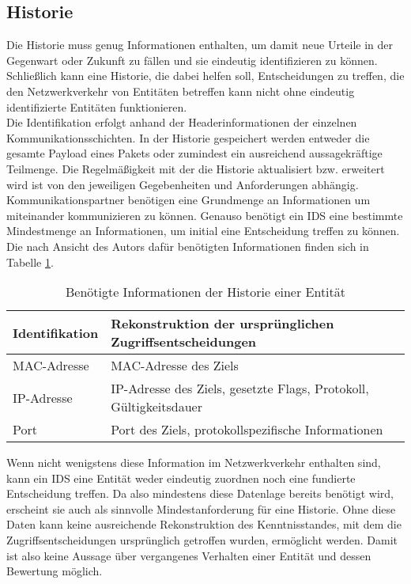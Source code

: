 \subsection{Historie}
\label{subs:Form_Hist}
Die Historie muss genug Informationen enthalten, um damit neue Urteile in der Gegenwart oder Zukunft zu fällen und sie eindeutig identifizieren zu können. Schließlich kann eine Historie, die dabei helfen soll, Entscheidungen zu treffen, die den Netzwerkverkehr von Entitäten betreffen kann nicht ohne eindeutig identifizierte Entitäten funktionieren.\\ Die Identifikation erfolgt anhand der Headerinformationen der einzelnen Kommunikationsschichten. In der Historie gespeichert werden entweder die gesamte Payload eines Pakets oder zumindest ein ausreichend aussagekräftige Teilmenge. Die Regelmäßigkeit mit der die Historie aktualisiert bzw. erweitert wird ist von den jeweiligen Gegebenheiten und Anforderungen abhängig. Kommunikationspartner benötigen eine Grundmenge an Informationen um miteinander kommunizieren zu können. Genauso benötigt ein IDS  eine bestimmte Mindestmenge an Informationen, um initial eine Entscheidung treffen zu können. Die nach Ansicht des Autors dafür benötigten Informationen finden sich in Tabelle \ref{Tabelle_3}.
\begin{table}[H]
\label{Tabelle_3}
\caption{Benötigte Informationen der Historie einer Entität}
\begin{tabularx}{\columnwidth}{p{3cm} p{12cm}}
\toprule
Identifikation & Rekonstruktion der ursprünglichen  Zugriffsentscheidungen\\
\midrule
MAC-Adresse & MAC-Adresse des Ziels \\
IP-Adresse & IP-Adresse des Ziels, gesetzte Flags, Protokoll, Gültigkeitsdauer \\
Port & Port des Ziels, protokollspezifische Informationen \\
\bottomrule
\end{tabularx}
\end{table}
Wenn nicht wenigstens diese Information im Netzwerkverkehr enthalten sind, kann ein IDS eine Entität weder eindeutig zuordnen noch eine fundierte Entscheidung treffen. Da also mindestens diese Datenlage bereits benötigt wird, erscheint sie auch als sinnvolle Mindestanforderung für eine Historie. Ohne diese Daten kann keine ausreichende Rekonstruktion des Kenntnisstandes, mit dem die Zugriffsentscheidungen ursprünglich getroffen wurden, ermöglicht werden. Damit ist also keine Aussage über vergangenes Verhalten einer Entität und dessen Bewertung möglich.
